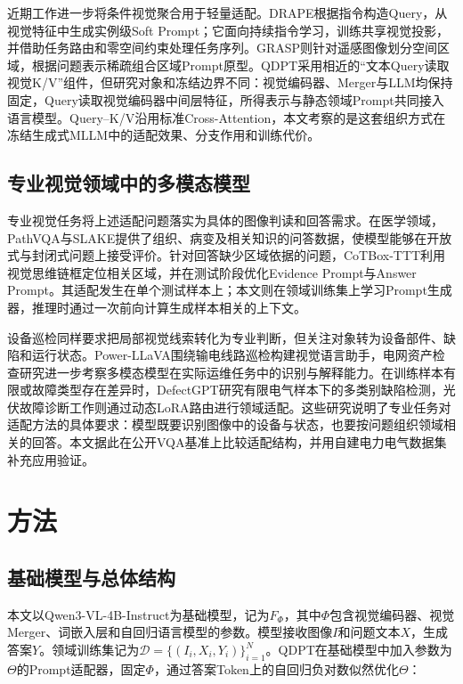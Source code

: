 \documentclass[pdflatex,sn-mathphys-num]{sn-jnl}
\begin{document}
近期工作进一步将条件视觉聚合用于轻量适配。DRAPE根据指令构造Query，从视觉特征中生成实例级Soft Prompt；它面向持续指令学习，训练共享视觉投影，并借助任务路由和零空间约束处理任务序列\cite{Hu2026DynamicCP}。GRASP则针对遥感图像划分空间区域，根据问题表示稀疏组合区域Prompt原型\cite{Sun2026GRASPGR}。QDPT采用相近的“文本Query读取视觉K/V”组件，但研究对象和冻结边界不同：视觉编码器、Merger与LLM均保持固定，Query读取视觉编码器中间层特征，所得表示与静态领域Prompt共同接入语言模型。Query--K/V沿用标准Cross-Attention，本文考察的是这套组织方式在冻结生成式MLLM中的适配效果、分支作用和训练代价。

\subsection{专业视觉领域中的多模态模型}

专业视觉任务将上述适配问题落实为具体的图像判读和回答需求。在医学领域，PathVQA与SLAKE提供了组织、病变及相关知识的问答数据，使模型能够在开放式与封闭式问题上接受评价\cite{He2020PathVQA3Q,Liu2021SlakeAS}。针对回答缺少区域依据的问题，CoTBox-TTT利用视觉思维链框定位相关区域，并在测试阶段优化Evidence Prompt与Answer Prompt\cite{Qian2025CoTBoxTTTGM}。其适配发生在单个测试样本上；本文则在领域训练集上学习Prompt生成器，推理时通过一次前向计算生成样本相关的上下文。

设备巡检同样要求把局部视觉线索转化为专业判断，但关注对象转为设备部件、缺陷和运行状态。Power-LLaVA围绕输电线路巡检构建视觉语言助手\cite{Wang2024PowerLLaVALL}，电网资产检查研究进一步考察多模态模型在实际运维任务中的识别与解释能力\cite{Rocha2025AdvancesIE,Hao2025PowerGI}。在训练样本有限或故障类型存在差异时，DefectGPT研究有限电气样本下的多类别缺陷检测\cite{lin2025defectgpt}，光伏故障诊断工作则通过动态LoRA路由进行领域适配\cite{Wu2026DomainAdaptiveML}。这些研究说明了专业任务对适配方法的具体要求：模型既要识别图像中的设备与状态，也要按问题组织领域相关的回答。本文据此在公开VQA基准上比较适配结构，并用自建电力电气数据集补充应用验证。
\section{方法}
\label{sec:method}

\subsection{基础模型与总体结构}

本文以Qwen3-VL-4B-Instruct\cite{Bai2025Qwen3VLTR}为基础模型，记为$F_{\Phi}$，其中$\Phi$包含视觉编码器、视觉Merger、词嵌入层和自回归语言模型的参数。模型接收图像$I$和问题文本$X$，生成答案$Y$。领域训练集记为$\mathcal{D}=\{(I_i,X_i,Y_i)\}_{i=1}^{N}$。QDPT在基础模型中加入参数为$\Theta$的Prompt适配器，固定$\Phi$，通过答案Token上的自回归负对数似然优化$\Theta$：
\end{document}
